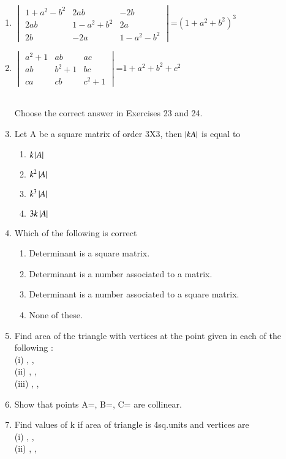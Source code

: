 \begin{enumerate}[label=\arabic*.,ref=\thesubsection.\theenumi]
\item $\begin{vmatrix}1+a^2-b^2&2ab&-2b \\ 2ab&1-a^2+b^2&2a \\ 2b&-2a&1-a^2-b^2\end{vmatrix}$=$(1+a^2+b^2)^3$
\item $\begin{vmatrix}a^2+1&ab&ac \\ ab&b^2+1&bc \\ ca&cb&c^2+1\end{vmatrix}$=$1+a^2+b^2+c^2$\\
\\
\solution 

Choose the correct answer in Exercises 23 and 24.
\item Let A be a square matrix of order 3X3, then 
$\left\vert kA\right\vert$ is equal to
\begin{enumerate}
\item $k\left\vert A\right\vert$
\item $k^2\left\vert A\right\vert$
\item $k^3\left\vert A\right\vert$
\item $3k\left\vert A\right\vert$
\end{enumerate} 
\item Which of the following is correct
\begin{enumerate}
\item Determinant is a square matrix.
\item Determinant is a number associated to a matrix.
\item Determinant is a number associated to a square matrix.
\item None of these.
\end{enumerate}
\item Find area of the triangle with vertices at the point given in each of the following :\\
(i) , , \\
(ii) , , \\
(iii) , , \\
\item Show that points A=, B=, C= are collinear.
\\
\solution 

\item Find values of k if area of triangle is 4sq.units and vertices are \\
(i) , ,  \\ (ii) , , 

\end{enumerate}
